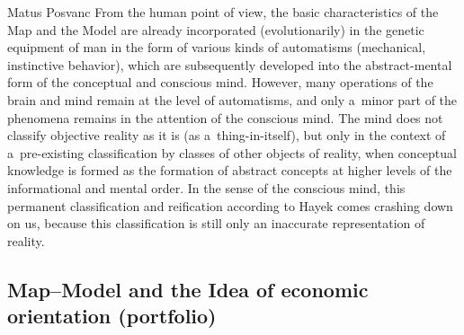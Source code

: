\begin{artengenv}{Matus Posvanc}
From the human point of view, the basic characteristics of the Map and the Model are already incorporated (evolutionarily) in the genetic equipment of man in the form of various kinds of automatisms (mechanical, instinctive behavior), which are subsequently developed into the abstract-mental form of the conceptual and conscious mind. However, many operations of the brain and mind remain at the level of automatisms, and only a~minor part of the phenomena remains in the attention of the conscious mind. The mind does not classify objective reality as it is (as a~thing-in-itself), but only in the context of a~pre-existing classification by classes of other objects of reality, when conceptual knowledge is formed as the formation of abstract concepts at higher levels of the informational and mental order. In the sense of the conscious mind, this permanent classification and reification according to Hayek 
\parencite*[][sec.6.47]{Hayek1952Sensory} %
 comes crashing down on us, because this classification is still only an inaccurate representation of reality.



\subsection*{Map–Model and the Idea of economic orientation (portfolio) }




\end{artengenv}
